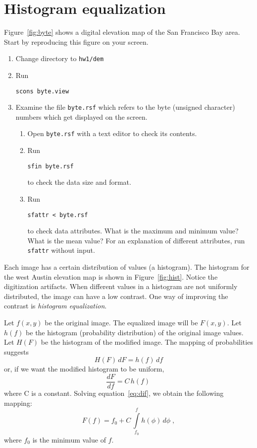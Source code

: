 \section{Histogram equalization}


Figure~\ref{fig:byte} shows a digital elevation map of the San
Francisco Bay area. Start by reproducing this figure on your screen.
\begin{enumerate}
\item Change directory to \verb#hw1/dem#
\item Run
\begin{verbatim}
scons byte.view
\end{verbatim}
\item Examine the file \texttt{byte.rsf} which refers to the 
byte (unsigned character) numbers which get displayed on the screen.
\begin{enumerate}
\item Open \texttt{byte.rsf} with a text editor to check its contents.
\item Run
\begin{verbatim}
sfin byte.rsf
\end{verbatim}
to check the data size and format.
\item Run
\begin{verbatim}
sfattr < byte.rsf
\end{verbatim}
to check data attributes. What is the maximum and minimum value? What
is the mean value? For an explanation of different attributes,
run \texttt{sfattr} without input.
\end{enumerate}
\end{enumerate}

Each image has a certain distribution of values (a histogram). The
histogram for the west Austin elevation map is shown in
Figure~\ref{fig:hist}. Notice the digitization artifacts. When
different values in a histogram are not uniformly distributed, the
image can have a low contrast. One way of improving the contrast is
\emph{histogram equalization}.


Let $f(x,y)$ be the original image. The equalized image will be
$F(x,y)$. Let $h(f)$ be the histogram (probability distribution) of
the original image values. Let $H(F)$ be the histogram of the modified
image. The mapping of probabilities suggests
\begin{equation}
\label{eq:prob}
H(F)\,dF = h(f)\,df
\end{equation}
or, if we want the modified histogram
to be uniform, 
\begin{equation}
\label{eq:dif}
\frac{d F}{d f} = C\,h(f)\,
\end{equation}
where C is a constant. 
Solving equation~\ref{eq:dif}, we obtain the following mapping:
\begin{equation}
\label{eq:int}
F(f) = f_0 + C\,\int\limits_{f_0}^f h(\phi)\,d\phi\;,
\end{equation}
where $f_0$ is the minimum value of $f$.

